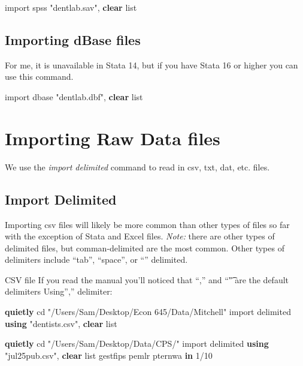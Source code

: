 \documentclass[
]{book}
\newenvironment{Shaded}{\begin{snugshade}}{\end{snugshade}}
\newcommand{\KeywordTok}[1]{\textcolor[rgb]{0.13,0.29,0.53}{\textbf{#1}}}
\newcommand{\NormalTok}[1]{#1}
\newcommand{\OtherTok}[1]{\textcolor[rgb]{0.56,0.35,0.01}{#1}}
\newcommand{\StringTok}[1]{\textcolor[rgb]{0.31,0.60,0.02}{#1}}
\begin{document}
\begin{Shaded}
\begin{Highlighting}[]
\NormalTok{import spss }\StringTok{"dentlab.sav"}\NormalTok{, }\KeywordTok{clear}
\OtherTok{list}
\end{Highlighting}
\end{Shaded}

\subsection{Importing dBase files}\label{importing-dbase-files}

For me, it is unavailable in Stata 14, but if you have Stata 16 or higher you can use this command.

\begin{Shaded}
\begin{Highlighting}[]
\NormalTok{import dbase }\StringTok{"dentlab.dbf"}\NormalTok{, }\KeywordTok{clear}
\OtherTok{list}
\end{Highlighting}
\end{Shaded}

\section{Importing Raw Data files}\label{importing-raw-data-files}

We use the \emph{import delimited} command to read in csv, txt, dat, etc. files.

\subsection{Import Delimited}\label{import-delimited}

Importing csv files will likely be more common than other types of files so far with the exception of Stata and Excel files. \emph{Note:} there are other types of delimited files, but comman-delimited are the most common. Other types of delimiters include ``tab'', ``space'', or ``\textbar{}'' delimited.

CSV file
If you read the manual you'll noticed that ``,'' and ``\t" are the default delimiters
Using'','' delimiter:

\begin{Shaded}
\begin{Highlighting}[]
\KeywordTok{quietly}\NormalTok{ cd }\StringTok{"/Users/Sam/Desktop/Econ 645/Data/Mitchell"}
\NormalTok{import delimited }\KeywordTok{using} \StringTok{"dentists.csv"}\NormalTok{, }\KeywordTok{clear}
\OtherTok{list}

\KeywordTok{quietly}\NormalTok{ cd }\StringTok{"/Users/Sam/Desktop/Data/CPS/"}
\NormalTok{import delimited }\KeywordTok{using} \StringTok{"jul25pub.csv"}\NormalTok{, }\KeywordTok{clear}
\OtherTok{list}\NormalTok{ gestfips pemlr pternwa }\KeywordTok{in}\NormalTok{ 1/10}
\end{Highlighting}
\end{Shaded}
\end{document}
